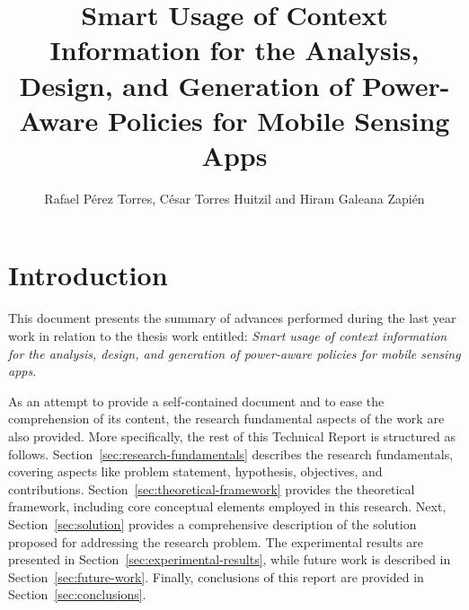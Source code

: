 \documentclass[ENG,PhD]{cinvestav}
\title{Smart Usage of Context Information for the Analysis, Design, and Generation of Power-Aware Policies for Mobile Sensing Apps}
\author{Rafael Pérez Torres, César Torres Huitzil and Hiram Galeana Zapién}
\begin{document}
\makeintropages

\renewcommand{\baselinestretch}{1.2}

%                                                                                              
\section{Introduction}
This document presents the summary of advances performed during the last year work in relation to the thesis work entitled: \emph{Smart usage of context information for the analysis, design, and generation of power-aware policies for mobile sensing apps}.

As an attempt to provide a self-contained document and to ease the comprehension of its content, the research fundamental aspects of the work are also provided.
More specifically, the rest of this Technical Report is structured as follows.
Section~\ref{sec:research-fundamentals} describes the research fundamentals, covering aspects like problem statement, hypothesis, objectives, and contributions.
Section~\ref{sec:theoretical-framework} provides the theoretical framework, including core conceptual elements employed in this research.
Next, Section~\ref{sec:solution} provides a comprehensive description of the solution proposed for addressing the research problem.
The experimental results are presented in Section~\ref{sec:experimental-results}, while future work is described in Section~\ref{sec:future-work}.
Finally, conclusions of this report are provided in Section~\ref{sec:conclusions}.
\end{document}
